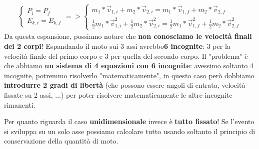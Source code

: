             \begin{align*}
                \begin{cases}
                    P_i=P_f\\
                    E_{k, i}=E_{k, f}
                \end{cases}=>
                \begin{cases}
                    m_1*\vec{v}_{1, i}+m_2*\vec{v}_{2, i}=m_1*\vec{v}_{1, f}+m_2*\vec{v}_{2, f}\\
                    \frac{1}{2}m_1*\vec{v}^2_{1, i}+\frac{1}{2}m_2*\vec{v}^2_{2, i}=\frac{1}{2}m_1*\vec{v}^2_{1, f}+\frac{1}{2}m_2*\vec{v}^2_{2, f}
                \end{cases}
            \end{align*}
            Da questa espansione, possiamo notare che \textbf{non conosciamo le velocità finali dei 2 corpi}! Espandando il moto sui 3 assi avrebbo\textbf{6 incognite}: 3 per la velocità finale del primo corpo e 3 per quella del secondo corpo. Il "problema" è che abbiamo \textbf{un sistema di 4 equazioni con 6 incognite}: avessimo soltanto 4 incognite, potremmo risolverlo "matematicamente", in questo caso però dobbiamo \textbf{introdurre 2 gradi di libertà} (che possono essere angoli di entrata, velocità fissate su 2 assi, ...) per poter risolvere matematicamente le altre incognite rimanenti.

            Per quanto riguarda il caso \textbf{unidimensionale} invece è \textbf{tutto fissato}! Se l'evento si sviluppa su un solo asse possiamo calcolare tutto usando soltanto il principio di conservazione della quantità di moto.

